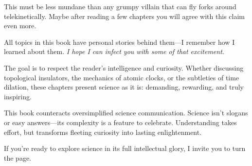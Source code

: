 This must be less mundane than any grumpy villain that can fly forks around telekinetically. Maybe after reading a few chapters you will agree with this claim even more.

All topics in this book have personal stories behind them—I remember how I learned about them. \textit{I hope I can infect you with some of that excitement.}

The goal is to respect the reader's intelligence and curiosity. Whether discussing topological insulators, the mechanics of atomic clocks, or the subtleties of time dilation, these chapters present science as it is: demanding, rewarding, and truly inspiring.

This book counteracts oversimplified science communication. Science isn't slogans or easy answers—its complexity is a feature to celebrate. Understanding takes effort, but transforms fleeting curiosity into lasting enlightenment.

If you’re ready to explore science in its full intellectual glory, I invite you to turn the page.

